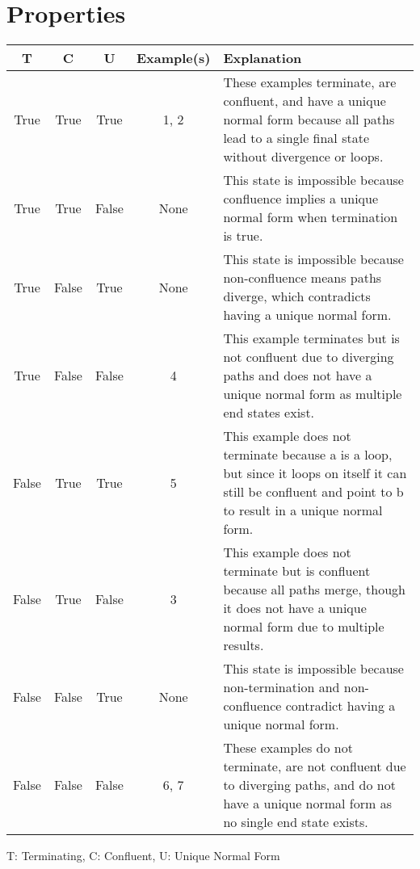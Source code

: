 \documentclass{article}
\begin{document}
\section*{Properties}
\begin{tabular}{c c c c p{8cm}}
     T & C & U & Example(s) & Explanation \\ \hline
    True & True & True & 1, 2 & These examples terminate, are confluent, and have a unique normal form because all paths lead to a single final state without divergence or loops. \\
    True & True & False & None & This state is impossible because confluence implies a unique normal form when termination is true. \\
    True & False & True & None & This state is impossible because non-confluence means paths diverge, which contradicts having a unique normal form. \\
    True & False & False & 4 & This example terminates but is not confluent due to diverging paths and does not have a unique normal form as multiple end states exist. \\
    False & True & True & 5 & This example does not terminate because a is a loop, but since it loops on itself it can still be confluent and point to b to result in a unique normal form. \\
    False & True & False & 3 & This example does not terminate but is confluent because all paths merge, though it does not have a unique normal form due to multiple results. \\
    False & False & True & None & This state is impossible because non-termination and non-confluence contradict having a unique normal form. \\
    False & False & False &  6, 7 & These examples do not terminate, are not confluent due to diverging paths, and do not have a unique normal form as no single end state exists. \\
\end{tabular}

\vspace{4em}
\noindent T: Terminating, C: Confluent, U: Unique Normal Form
\end{document}
